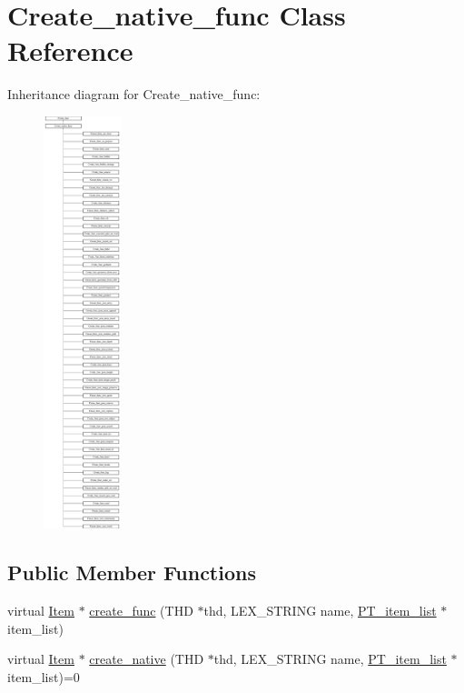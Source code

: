 \hypertarget{classCreate__native__func}{}\section{Create\+\_\+native\+\_\+func Class Reference}
\label{classCreate__native__func}
Inheritance diagram for Create\+\_\+native\+\_\+func\+:\begin{figure}[H]
\begin{center}
\leavevmode
\includegraphics[height=12.000000cm]{classCreate__native__func}
\end{center}
\end{figure}
\subsection*{Public Member Functions}
\begin{DoxyCompactItemize}
\item 
virtual \mbox{\hyperlink{classItem}{Item}} $\ast$ \mbox{\hyperlink{classCreate__native__func_ac93ced4c4ed523538b76d34d17377a40}{create\+\_\+func}} (T\+HD $\ast$thd, L\+E\+X\+\_\+\+S\+T\+R\+I\+NG name, \mbox{\hyperlink{classPT__item__list}{P\+T\+\_\+item\+\_\+list}} $\ast$item\+\_\+list)
\item 
virtual \mbox{\hyperlink{classItem}{Item}} $\ast$ \mbox{\hyperlink{classCreate__native__func_a52a42d6a191ca6e9627fb34d91e97ebc}{create\+\_\+native}} (T\+HD $\ast$thd, L\+E\+X\+\_\+\+S\+T\+R\+I\+NG name, \mbox{\hyperlink{classPT__item__list}{P\+T\+\_\+item\+\_\+list}} $\ast$item\+\_\+list)=0
\end{DoxyCompactItemize}
